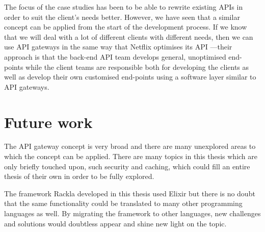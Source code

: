 \documentclass{cslthse-msc}
\begin{document}
The focus of the case studies has been to be able to rewrite existing APIs in order to suit the client's needs better. However, we have seen that a similar concept can be applied from the start of the development process. If we know that we will deal with a lot of different clients with different needs, then we can use API gateways in the same way that Netflix optimises its API \cite{netflix}---their approach is that the back-end API team develops general, unoptimised end-points while the client teams are responsible both for developing the clients as well as develop their own customised end-points using a software layer similar to API gateways.

\section{Future work}

The API gateway concept is very broad and there are many unexplored areas to which the concept can be applied. There are many topics in this thesis which are only briefly touched upon, such security and caching, which could fill an entire thesis of their own in order to be fully explored.

The framework Rackla developed in this thesis used Elixir but there is no doubt that the same functionality could be translated to many other programming languages as well. By migrating the framework to other languages, new challenges and solutions would doubtless appear and shine new light on the topic. 

\cleardoublepage
{}
{}


\end{document}
